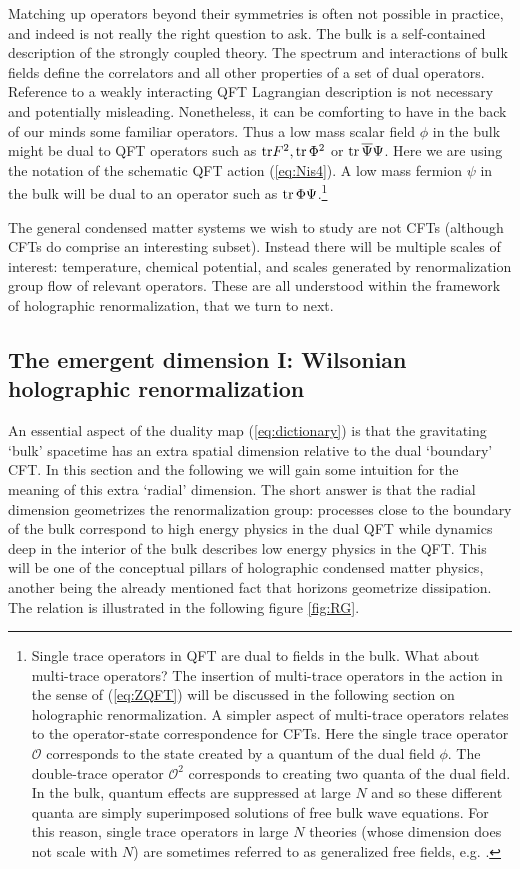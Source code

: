 \documentclass[10pt, oneside]{book}
\newcommand{\tr}{{\rm tr} }
\def\ocal{{\mathcal{O}}}
\begin{document}
\begin{doublespace}
Matching up operators beyond their symmetries is often not possible in practice, and indeed is not really the right question to ask. The bulk is a self-contained description of the strongly coupled theory. The spectrum and interactions of bulk fields define the correlators and all other properties of a set of dual operators. Reference to a weakly interacting QFT Lagrangian description is not necessary and potentially misleading. Nonetheless, it can be comforting to have in the back of our minds some familiar operators. Thus a low mass scalar field $\phi$ in the bulk might be dual to QFT operators such as $\tr F^2, \tr \, \Phi^2$ or $\tr \, \overline \Psi \Psi$. Here we are using the notation of the schematic QFT action (\ref{eq:Nis4}). A low mass fermion $\psi$ in the bulk will be dual to an operator such as $\tr \, \Phi \Psi$.\footnote{
Single trace operators in QFT are dual to fields in the bulk. What about multi-trace operators? The insertion of multi-trace operators in the action in the sense of (\ref{eq:ZQFT}) will be discussed in the following section on holographic renormalization. A simpler aspect of multi-trace operators relates to the operator-state correspondence for CFTs. Here the single trace operator $\ocal$ corresponds to the state created by a quantum of the dual field $\phi$. The double-trace operator $\ocal^2$ corresponds to creating two quanta of the dual field. In the bulk, quantum effects are suppressed at large $N$ and so these different quanta are simply superimposed solutions of free bulk wave equations. For this reason, single trace operators in large $N$ theories (whose dimension does not scale with $N$) are sometimes referred to as generalized free fields, e.g. \cite{ElShowk:2011ag}.}

The general condensed matter systems we wish to study are not CFTs (although CFTs do comprise an interesting subset). Instead there will be multiple scales of interest: temperature, chemical potential, and scales generated by renormalization group flow of relevant operators. These are all understood within the framework of holographic renormalization, that we turn to next.

\subsection{The emergent dimension I: Wilsonian holographic renormalization}
\label{sec:wilson}

An essential aspect of the duality map (\ref{eq:dictionary}) is that the gravitating `bulk' spacetime has an extra spatial dimension relative to the dual `boundary' CFT. In this section and the following we will gain some intuition for the meaning of this extra `radial' dimension. The short answer is that the radial dimension geometrizes the renormalization group: processes close to the boundary of the bulk correspond to high energy physics in the dual QFT while dynamics deep in the interior of the bulk describes low energy physics in the QFT. This will be one of the conceptual pillars of holographic condensed matter physics, another being the already mentioned fact that horizons geometrize dissipation. The relation is illustrated in the following figure \ref{fig:RG}.


\end{doublespace}
\end{document}
